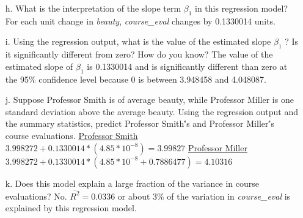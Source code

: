 \documentclass{article}
\begin{document}
\begin{enumerate}
\begin{enumerate}
\newline
\item[h.] What is the interpretation of the slope term $\beta_1$ in this regression model? 
\newline\newline
For each unit change in {\it{beauty}}, {\it{course\_eval}} changes by 0.1330014 units.
\newline
\item[i.] Using the regression output, what is the value of the estimated slope $\beta_1$ ?  Is it significantly different from zero? How do you know?
\newline\newline
The value of the estimated slope of $\beta_1$ is 0.1330014 and is significantly different than zero at the 95\% confidence level because 0 is between 3.948458 and 4.048087.
\newline
\item[j.] Suppose Professor Smith is of average beauty, while Professor Miller is one standard deviation above the average beauty.  Using the regression output and the summary statistics, predict Professor Smith\'’s and Professor Miller\'’s course evaluations.
\newline\newline
\uline{Professor Smith}\newline
$3.998272 + 0.1330014 * (4.85 * 10^{-8}) = 3.99827$
\newline\newline
\uline{Professor Miller}\newline
$3.998272 + 0.1330014 * (4.85 * 10^{-8} + 0.7886477) = 4.10316$
\newline
\item[k.]Does this model explain a large fraction of the variance in course evaluations?
\newline\newline
No.  $\bar{R^2} = 0.0336$ or about 3\% of the variation in {\it{course\_eval}} is explained by this regression model.
\end{enumerate}
\end{enumerate}
\end{document}
